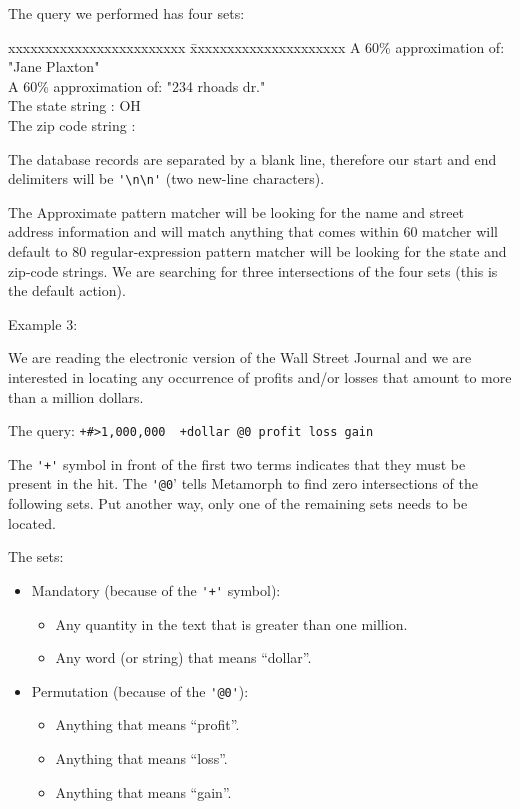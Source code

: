 The query we performed has four sets:

\begin{tabbing}
xxxxxxxxxxxxxxxxxxxxxxxx \= xxxxxxxxxxxxxxxxxxxxx \kill
A 60\% approximation of:   \> "Jane Plaxton"       \\
A 60\% approximation of:   \> "234 rhoads dr."     \\
The state string      :   \> OH                   \\
The zip code string   :                   \\
\end{tabbing}

The database records are separated by a blank line, therefore our
start and end delimiters will be \verb`'\n\n'` (two new-line characters).

The Approximate pattern matcher will be looking for the name and
street address information and will match anything that comes
within 60%
matcher will default to 80%
regular-expression pattern matcher will be looking for the state
and zip-code strings.  We are searching for three intersections of
the four sets (this is the default action).

Example 3:

We are reading the electronic version of the Wall Street Journal
and we are interested in locating any occurrence of profits and/or
losses that amount to more than a million dollars.

The query:   \verb`+#>1,000,000  +dollar @0 profit loss gain`

The \verb`'+'` symbol in front of the first two terms indicates that they
must be present in the hit.  The \verb`'@0`' tells Metamorph to find zero
intersections of the following sets.  Put another way, only one of
the remaining sets needs to be located.

The sets:
\begin{itemize}
\item Mandatory (because of the \verb`'+'` symbol):
    \begin{itemize}
    \item Any quantity in the text that is greater than one million.
    \item Any word (or string) that means ``dollar''.
    \end{itemize}
\item Permutation (because of the \verb`'@0'`):
    \begin{itemize}
    \item Anything that means ``profit''.
    \item Anything that means ``loss''.
    \item Anything that means ``gain''.
    \end{itemize}
\end{itemize}

